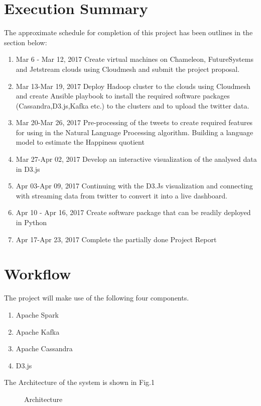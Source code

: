 \documentclass[9pt,twocolumn,twoside]{../../styles/osajnl}
\begin{document}
\section{Execution Summary}
The approximate schedule for completion of this project has been outlines in the section below:
\begin{enumerate}
\item {Mar 6 - Mar 12, 2017} Create virtual machines on Chameleon, FutureSystems and Jetstream clouds using Cloudmesh and submit the project proposal.
\item {Mar 13-Mar 19, 2017} Deploy Hadoop cluster to the clouds using Cloudmesh and create Ansible playbook to install the required software packages (Cassandra,D3.js,Kafka etc.) to the clusters  and to upload the twitter data.
\item {Mar 20-Mar 26, 2017} Pre-processing of the tweets to create required features for using in the Natural Language Processing algorithm. Building a language model to estimate the Happiness quotient
\item {Mar 27-Apr 02, 2017} Develop an interactive visualization of the analysed data in D3.js
\item {Apr 03-Apr 09, 2017} Continuing with the D3.Js visualization and connecting with streaming data from twitter to convert it into a live dashboard.
\item {Apr 10 - Apr 16, 2017} Create software package that can be readily deployed in Python
\item {Apr 17-Apr 23, 2017} Complete the partially done  Project Report
\end{enumerate}

\section{Workflow}
The project will make use of the following four components. 
\begin{enumerate}
    \item Apache Spark
    \item Apache Kafka
    \item Apache Cassandra
    \item D3.js
\end{enumerate}

The Architecture of the system is shown in Fig.1
\begin{figure}[htbp]
\centering
{}
\caption{Architecture}
\label{fig:false-color}
\end{figure}
\end{document}
